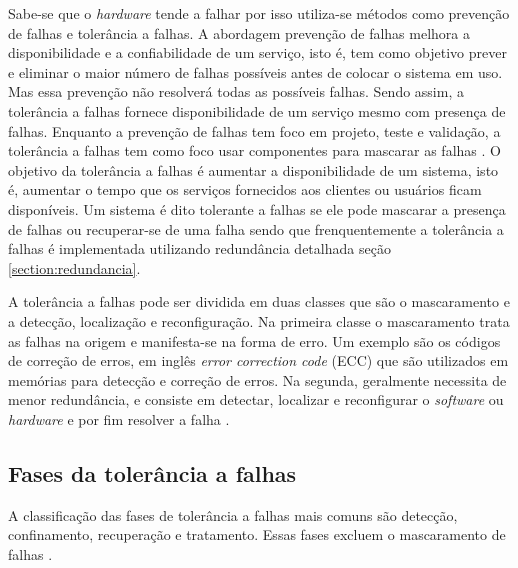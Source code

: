 Sabe-se que o \textit{hardware} tende a falhar por isso utiliza-se métodos como prevenção de falhas e tolerância a falhas. A abordagem 
prevenção de falhas melhora a disponibilidade e a confiabilidade de um serviço, isto é, tem como objetivo prever e eliminar 
o maior número de falhas possíveis antes de colocar o sistema em uso. Mas essa prevenção não resolverá todas as possíveis falhas. 
Sendo assim, a tolerância a falhas fornece disponibilidade de um serviço mesmo com presença de falhas. Enquanto a prevenção de falhas 
tem foco em projeto, teste e validação, a tolerância a falhas tem como foco usar componentes para mascarar as falhas \cite{pankaj1994}.
O objetivo da tolerância a falhas é aumentar a disponibilidade de um sistema, isto é, aumentar o tempo que os serviços fornecidos aos 
clientes ou usuários ficam disponíveis. Um sistema é dito tolerante a falhas se ele pode mascarar a presença de falhas ou recuperar-se 
de uma falha sendo que frenquentemente a tolerância a falhas é implementada utilizando redundância detalhada seção \ref{section:redundancia}.

A tolerância a falhas pode ser dividida em duas classes que são o mascaramento e a detecção, localização e reconfiguração.
Na primeira classe o mascaramento trata as falhas na origem e manifesta-se na forma de erro. Um exemplo são os códigos de correção de 
erros, em inglês \textit{error correction code} (ECC) que são utilizados em memórias para detecção e correção de erros.
Na segunda, geralmente necessita de menor redundância, e consiste em detectar, localizar e reconfigurar o \textit{software} ou
\textit{hardware} e por fim resolver a falha \cite{weber2002}.

\subsection{Fases da tolerância a falhas}

A classificação das fases de tolerância a falhas mais comuns são detecção, confinamento, recuperação e tratamento. Essas fases excluem
o mascaramento de falhas \cite{weber2002}.


